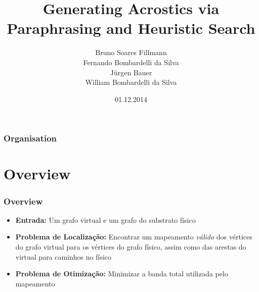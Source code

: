 \documentclass{beamer}
\title[Generating Acrostics via Paraphrasing and Heuristic Search]{Generating Acrostics via Paraphrasing and Heuristic Search} %
\author[Bruno, Fernando, Jürgen, William]{Bruno Soares Fillmann\\
Fernando Bombardelli da Silva\\
Jürgen Bauer\\
William Bombardelli da Silva
} %
\institute[TU Berlin] %
{
Technische Universität Berlin \\ %
Datenbanksysteme und Informationsmanagement \\
DBPRO – Database Projects (WS 2014/2015) \\
\medskip
}
\date{01.12.2014} %
\begin{document}
\begin{frame}
\titlepage %
\end{frame}

\begin{frame}
\frametitle{Organisation} %
\tableofcontents %
\end{frame}


\section{Overview} %


\begin{frame}
\frametitle{Overview}
\begin{itemize}
\item \textbf{Entrada:} Um grafo virtual e um grafo do substrato físico
\item \textbf{Problema de Localização:} Encontrar um mapeamento \emph{válido} dos vértices do grafo virtual para os vértices do grafo físico, assim como das arestas do virtual para caminhos no físico
\item \textbf{Problema de Otimização:} Minimizar a banda total utilizada pelo mapeamento
\end{itemize}
\end{frame}
\end{document}
